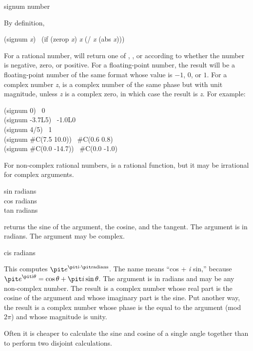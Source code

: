 \begin{defun}[Function]
signum number

By definition,
\begin{lisp}
(signum {\it x}) \EQ\ (if (zerop {\it x}) {\it x} (/ {\it x} (abs {\it x})))
\end{lisp}
For a rational number,  will return one of , , or 
according to whether the number is negative, zero, or positive.
For a floating-point number, the result will be a floating-point number
of the same format whose value is $-1$, $0$, or $1$.
For a complex number {\it z},  is a complex number of
the same phase but with unit magnitude, unless {\it z} is a complex zero,
in which case the result is {\it z}.
For example:
\begin{lisp}
(signum 0) \EV\ 0 \\
(signum -3.7L5) \EV\ -1.0L0 \\
(signum 4/5) \EV\ 1 \\
(signum \#C(7.5 10.0)) \EV\ \#C(0.6 0.8) \\
(signum \#C(0.0 -14.7)) \EV\ \#C(0.0 -1.0)
\end{lisp}
For non-complex rational numbers,  is a rational function,
but it may be irrational for complex arguments.
\end{defun}

\begin{defun}[Function]
sin radians \\
cos radians \\
tan radians

 returns the sine of the argument,  the cosine,
and  the tangent.  The argument is in radians.
The argument may be complex.
\end{defun}

\begin{defun}[Function]
cis radians

This computes $ {\it e} ^ {\hbox{\scriptsize\it i} \cdot \hbox{\scriptsize\it radians}} $.
The name  means ``cos + {\it i} sin,'' because
$ {\it e} ^{ \hbox{\scriptsize\it i} \theta } = \cos \theta + {\it i} \sin \theta $.
The argument is in
radians and may be any non-complex number.  The result is a complex
number whose real part is the cosine of the argument and whose imaginary
part is the sine.  Put another way, the result is a complex number whose
phase is the equal to the argument (mod $2\pi$)
and whose magnitude is unity.

\beforenoterule
\begin{implementation}
Often it is cheaper to calculate the sine and cosine
of a single angle together than to perform two disjoint calculations.
\end{implementation}
\afternoterule
\end{defun}

